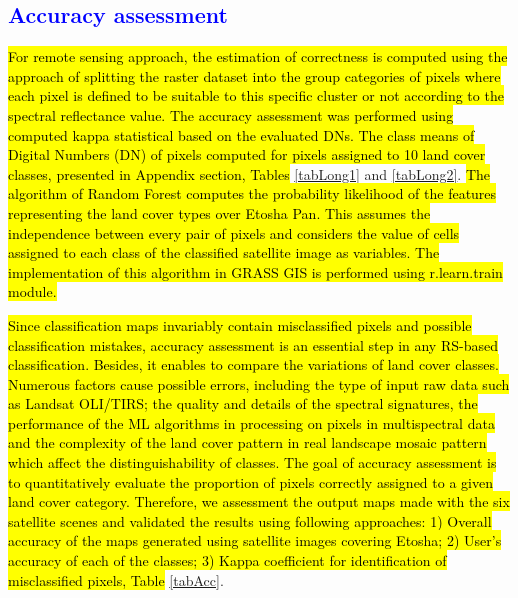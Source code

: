 \documentclass[climate,article,submit,pdftex,moreauthors]{Definitions/mdpi}
\begin{document}
\subsection{\textcolor{blue}{Accuracy assessment}}

\hl{For remote sensing approach, the estimation of correctness is computed using the approach of splitting the raster dataset into the group categories of pixels where each pixel is defined to be suitable to this specific cluster or not according to the spectral reflectance value. The accuracy assessment was performed using computed kappa statistical based on the evaluated DNs.
The class means of Digital Numbers (DN) of pixels computed for pixels assigned to 10 land cover classes, presented in Appendix section, Tables} \ref{tabLong1} and \ref{tabLong2}. \hl{The algorithm of Random Forest computes the probability likelihood of the features representing the land cover types over Etosha Pan. This assumes the independence between every pair of pixels and considers the value of cells assigned to each class of the classified satellite image as variables. The implementation of this algorithm in GRASS GIS is performed using r.learn.train module. }

\hl{Since classification maps invariably contain misclassified pixels and possible classification mistakes, accuracy assessment is an essential step in any RS-based classification. Besides, it enables to compare the variations of land cover classes. Numerous factors cause possible errors, including the type of input raw data such as Landsat OLI/TIRS; the quality and details of the spectral signatures, the performance of the ML algorithms in processing on pixels in multispectral data and the complexity of the land cover pattern in real landscape mosaic pattern which affect the distinguishability of classes. The goal of accuracy assessment is to quantitatively evaluate the proportion of pixels correctly assigned to a given land cover category. Therefore, we assessment the output maps made with the six satellite scenes and validated  the results using following approaches: 1) Overall accuracy of the maps generated using satellite images covering Etosha; 2) User's accuracy of each of the classes; 3) Kappa coefficient for identification of misclassified pixels, Table} \ref{tabAcc}.
\end{document}
